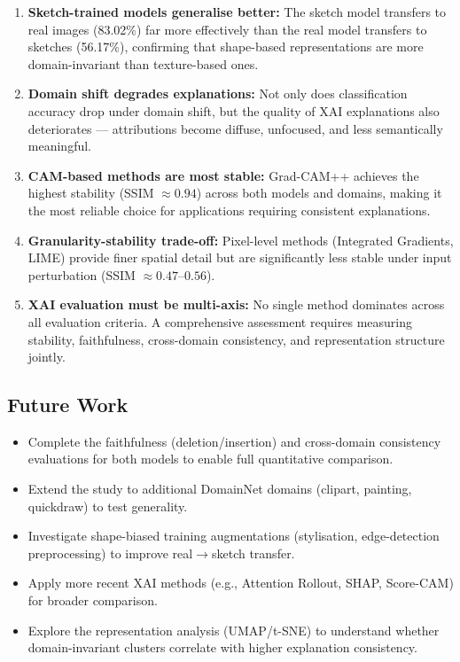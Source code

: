\documentclass[12pt, a4paper]{article}
\begin{document}
\begin{enumerate}[leftmargin=*]
    \item \textbf{Sketch-trained models generalise better:}  The sketch model
          transfers to real images (83.02\%) far more effectively than the real
          model transfers to sketches (56.17\%), confirming that shape-based
          representations are more domain-invariant than texture-based ones.

    \item \textbf{Domain shift degrades explanations:}  Not only does
          classification accuracy drop under domain shift, but the quality of
          XAI explanations also deteriorates --- attributions become diffuse,
          unfocused, and less semantically meaningful.

    \item \textbf{CAM-based methods are most stable:}  Grad-CAM++ achieves the
          highest stability (SSIM $\approx 0.94$) across both models and
          domains, making it the most reliable choice for applications
          requiring consistent explanations.

    \item \textbf{Granularity-stability trade-off:}  Pixel-level methods
          (Integrated Gradients, LIME) provide finer spatial detail but are
          significantly less stable under input perturbation (SSIM $\approx
          0.47$--$0.56$).

    \item \textbf{XAI evaluation must be multi-axis:}  No single method
          dominates across all evaluation criteria.  A comprehensive assessment
          requires measuring stability, faithfulness, cross-domain consistency,
          and representation structure jointly.
\end{enumerate}

\subsection{Future Work}

\begin{itemize}[leftmargin=*]
    \item Complete the faithfulness (deletion/insertion) and cross-domain
          consistency evaluations for both models to enable full quantitative
          comparison.
    \item Extend the study to additional DomainNet domains (clipart, painting,
          quickdraw) to test generality.
    \item Investigate shape-biased training augmentations (stylisation,
          edge-detection preprocessing) to improve real$\to$sketch transfer.
    \item Apply more recent XAI methods (e.g., Attention Rollout, SHAP,
          Score-CAM) for broader comparison.
    \item Explore the representation analysis (UMAP/t-SNE) to understand
          whether domain-invariant clusters correlate with higher explanation
          consistency.
\end{itemize}
\end{document}
